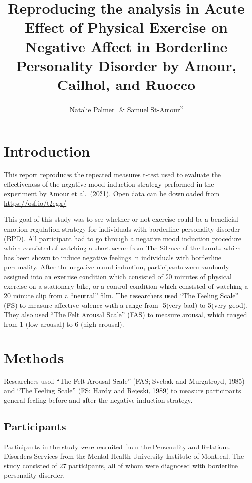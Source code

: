 \documentclass[
  english,
  man]{apa6}
\title{Reproducing the analysis in Acute Effect of Physical Exercise on Negative Affect in Borderline Personality Disorder by Amour, Cailhol, and Ruocco}
\author{Natalie Palmer\textsuperscript{1} \& Samuel St-Amour\textsuperscript{2}}
\date{}
\affiliation{\vspace{0.5cm}\textsuperscript{1} Brooklyn College of the City University of New York\\\textsuperscript{2} Department of Psychology (Scarborough), University of Toronto}
\begin{document}
\maketitle

\hypertarget{introduction}{%
\section{Introduction}\label{introduction}}

This report reproduces the repeated measures t-test used to evaluate the effectiveness of the negative mood induction strategy performed in the experiment by Amour et al.~(2021). Open data can be downloaded from \url{https://osf.io/t2egx/}.

This goal of this study was to see whether or not exercise could be a beneficial emotion regulation strategy for individuals with borderline personality disorder (BPD). All participant had to go through a negative mood induction procedure which consisted of watching a short scene from The Silence of the Lambs which has been shown to induce negative feelings in individuals with borderline personality. After the negative mood induction, participants were randomly assigned into an exercise condition which consisted of 20 minutes of physical exercise on a stationary bike, or a control condition which consisted of watching a 20 minute clip from a ``neutral'' film. The researchers used ``The Feeling Scale'' (FS) to measure affective valence with a range from -5(very bad) to 5(very good). They also used ``The Felt Arousal Scale'' (FAS) to measure arousal, which ranged from 1 (low arousal) to 6 (high arousal).

\hypertarget{methods}{%
\section{Methods}\label{methods}}

Researchers used ``The Felt Arousal Scale'' (FAS; Svebak and Murgatroyd, 1985) and ``The Feeling Scale'' (FS; Hardy and Rejeski, 1989) to measure participants general feeling before and after the negative induction strategy.

\hypertarget{participants}{%
\subsection{Participants}\label{participants}}

Participants in the study were recruited from the Personality and Relational Disorders Services from the Mental Health University Institute of Montreal. The study consisted of 27 participants, all of whom were diagnosed with borderline personality disorder.
\end{document}
